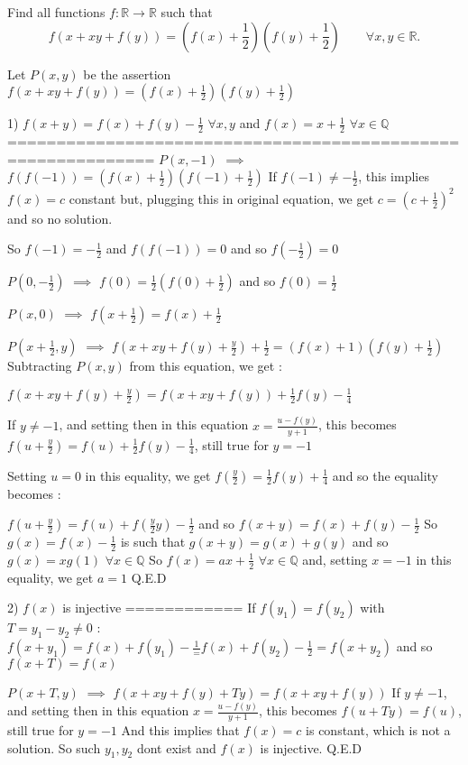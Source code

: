 \begin{solution}
	\begin{tcolorbox}Find all functions $f : \mathbb R \to \mathbb R$ such that 
\[f\left(x+xy+f(y)\right)= \left( f(x)+\frac 12 \right) \left( f(y)+\frac 12 \right) \qquad \forall x,y \in \mathbb R.\]\end{tcolorbox}
Let $P(x,y)$ be the assertion $f(x+xy+f(y))=\left(f(x)+\frac 12\right)\left(f(y)+\frac 12\right)$

1) $f(x+y)=f(x)+f(y)-\frac 12$ $\forall x,y$ and $f(x)=x+\frac 12$ $\forall x\in\mathbb Q$
=============================================================
$P(x,-1)$ $\implies$ $f(f(-1))=\left(f(x)+\frac 12\right)\left(f(-1)+\frac 12\right)$
If $f(-1)\ne -\frac 12$, this implies $f(x)=c$ constant but, plugging this in original equation, we get $c=(c+\frac 12)^2$ and so no solution.

So $f(-1)=-\frac 12$ and $f(f(-1))=0$ and so $f(-\frac 12)=0$

$P(0,-\frac 12)$ $\implies$ $f(0)=\frac 12\left(f(0)+\frac 12\right)$ and so $f(0)=\frac 12$

$P(x,0)$ $\implies$ $f(x+\frac 12)=f(x)+\frac 12$

$P(x+\frac 12,y)$ $\implies$ $f(x+xy+f(y)+\frac y2)+\frac 12=\left(f(x)+1\right)\left(f(y)+\frac 12\right)$
Subtracting $P(x,y)$ from this equation, we get :

$f(x+xy+f(y)+\frac y2)=f(x+xy+f(y))+\frac 12f(y)-\frac 14$

If $y\ne -1$, and setting then in this equation $x=\frac{u-f(y)}{y+1}$, this becomes $f(u+\frac y2)=f(u)+\frac 12f(y)-\frac 14$, still true for $y=-1$

Setting $u=0$ in this equality, we get $f(\frac y2)=\frac 12f(y)+\frac 14$ and so the equality becomes :

$f(u+\frac y2)=f(u)+f(\frac y2y)-\frac 12$ and so $f(x+y)=f(x)+f(y)-\frac 12$
So $g(x)=f(x)-\frac 12$ is such that $g(x+y)=g(x)+g(y)$ and so $g(x)=xg(1)$ $\forall x\in\mathbb Q$
So $f(x)=ax+\frac 12$ $\forall x\in\mathbb Q$ and, setting $x=-1$ in this equality, we get $a=1$
Q.E.D

2) $f(x)$ is injective
============
If $f(y_1)=f(y_2)$ with $T=y_1-y_2\ne 0$ :
$f(x+y_1)=f(x)+f(y_1)-\frac 1=f(x)+f(y_2)-\frac 12=f(x+y_2)$ and so $f(x+T)=f(x)$

$P(x+T,y)$ $\implies$ $f(x+xy+f(y)+Ty)=f(x+xy+f(y))$
If $y\ne -1$, and setting then in this equation $x=\frac{u-f(y)}{y+1}$, this becomes $f(u+Ty)=f(u)$, still true for $y=-1$
And this implies that $f(x)=c$ is constant, which is not a solution.
So such $y_1,y_2$ dont exist and $f(x)$ is injective.
Q.E.D


\end{solution}
